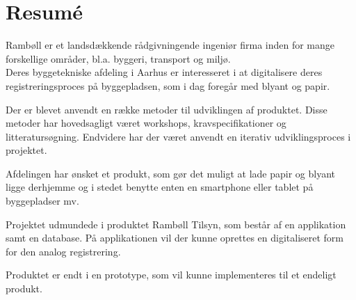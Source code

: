 \chapter*{Resumé}
Rambøll er et landsdækkende rådgivningende ingeniør firma inden for mange forskellige områder, bl.a. byggeri, transport og miljø. \\
Deres byggetekniske afdeling i Aarhus er interesseret i at digitalisere deres registreringsproces på byggepladsen, som i dag foregår med blyant og papir.

Der er blevet anvendt en række metoder til udviklingen af produktet. Disse metoder har hovedsagligt været workshops, kravspecifikationer og litteratursøgning. Endvidere har der været anvendt en iterativ udviklingsproces i projektet.

Afdelingen har ønsket et produkt, som gør det muligt at lade papir og blyant ligge derhjemme og i stedet benytte enten en smartphone eller tablet på byggepladser mv.

Projektet udmundede i produktet Rambøll Tilsyn, som består af en applikation samt en database.
På applikationen vil der kunne oprettes en digitaliseret form for den analog registrering. 

Produktet er endt i en prototype, som vil kunne implementeres til et endeligt produkt.

\clearpage
